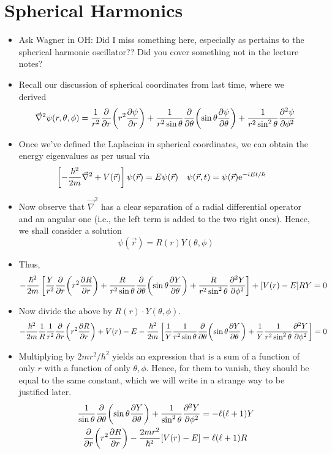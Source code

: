 \documentclass[../notes.tex]{subfiles}
\begin{document}
\section{Spherical Harmonics}
\begin{itemize}
    \item {}Ask Wagner in OH: Did I miss something here, especially as pertains to the spherical harmonic oscillator?? Did you cover something not in the lecture notes?
    \item Recall our discussion of spherical coordinates from last time, where we derived
    \begin{equation*}
        \vec{\nabla}^2\psi(r,\theta,\phi) = \frac{1}{r^2}\pdv{r}(r^2\pdv{\psi}{r})+\frac{1}{r^2\sin\theta}\pdv{\theta}(\sin\theta\pdv{\psi}{\theta})+\frac{1}{r^2\sin^2\theta}\pdv[2]{\psi}{\phi}
    \end{equation*}
    \item Once we've defined the Laplacian in spherical coordinates, we can obtain the energy eigenvalues as per usual via
    \begin{align*}
        \left[ -\frac{\hbar^2}{2m}\vec{\nabla}^2+V(\vec{r}) \right]\psi(\vec{r}) &= E\psi(\vec{r})&
        \psi(\vec{r},t) &= \psi(\vec{r})\e[-iEt/\hbar]
    \end{align*}
    \item Now observe that $\vec{\nabla}^2$ has a clear separation of a radial differential operator and an angular one (i.e., the left term is added to the two right ones). Hence, we shall consider a solution
    \begin{equation*}
        \psi(\vec{r}) = R(r)Y(\theta,\phi)
    \end{equation*}
    \item Thus,
    \begin{equation*}
        -\frac{\hbar^2}{2m}\left[ \frac{Y}{r^2}\pdv{r}(r^2\pdv{R}{r})+\frac{R}{r^2\sin\theta}\pdv{\theta}(\sin\theta\pdv{Y}{\theta})+\frac{R}{r^2\sin^2\theta}\pdv[2]{Y}{\phi} \right]+[V(r)-E]RY = 0
    \end{equation*}
    \item Now divide the above by $R(r)\cdot Y(\theta,\phi)$.
    \begin{equation*}
        -\frac{\hbar^2}{2m}\frac{1}{R}\frac{1}{r^2}\pdv{r}(r^2\pdv{R}{r})+V(r)-E-\frac{\hbar^2}{2m}\left[ \frac{1}{Y}\frac{1}{r^2\sin\theta}\pdv{\theta}(\sin\theta\pdv{Y}{\theta})+\frac{1}{Y}\frac{1}{r^2\sin^2\theta}\pdv[2]{Y}{\phi} \right] = 0
    \end{equation*}
    \item Multiplying by $2mr^2/\hbar^2$ yields an expression that is a sum of a function of only $r$ with a function of only $\theta,\phi$. Hence, for them to vanish, they should be equal to the same constant, which we will write in a strange way to be justified later.
    \begin{align*}
        \frac{1}{\sin\theta}\pdv{\theta}(\sin\theta\pdv{Y}{\theta})+\frac{1}{\sin^2\theta}\pdv[2]{Y}{\phi} &= -\ell(\ell+1)Y\\
        \pdv{r}(r^2\pdv{R}{r})-\frac{2mr^2}{\hbar^2}[V(r)-E] &= \ell(\ell+1)R
    \end{align*}
\end{itemize}
\end{document}
